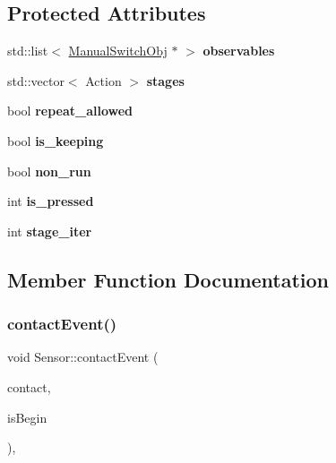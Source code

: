 \subsection*{Protected Attributes}
\begin{DoxyCompactItemize}
\item 
\mbox{\label{class_sensor_a3056529f52d9af83b78bc7ca7e2e7ef2}} 
std\+::list$<$ \hyperlink{class_manual_switch_obj}{Manual\+Switch\+Obj} $\ast$ $>$ {\bfseries observables}
\item 
\mbox{\label{class_sensor_a2450a980532d0448e7ea1f9db91f79f7}} 
std\+::vector$<$ Action $>$ {\bfseries stages}
\item 
\mbox{\label{class_sensor_a8554cb0f6e9cfcc6f277795bdd45ce14}} 
bool {\bfseries repeat\+\_\+allowed}
\item 
\mbox{\label{class_sensor_ace9f91b1e1034b501ba8f16e46b61698}} 
bool {\bfseries is\+\_\+keeping}
\item 
\mbox{\label{class_sensor_a40badc87a0a663f3bcbc95867b6f6296}} 
bool {\bfseries non\+\_\+run}
\item 
\mbox{\label{class_sensor_aff0be53ae0ed2e7f2a34e93bd78eed5d}} 
int {\bfseries is\+\_\+pressed}
\item 
\mbox{\label{class_sensor_aaf93d0f69a770e911edaf5f265eec623}} 
int {\bfseries stage\+\_\+iter}
\end{DoxyCompactItemize}


\subsection{Member Function Documentation}
\mbox{\label{class_sensor_a08bfa36c84277677f3bd5fb14127fca7}} 
\subsubsection{\texorpdfstring{contact\+Event()}{contactEvent()}}
{\footnotesize\ttfamily void Sensor\+::contact\+Event (\begin{DoxyParamCaption}\item[{b2\+Contact $\ast$}]{contact,  }\item[{bool}]{is\+Begin }\end{DoxyParamCaption})\hspace{0.3cm}{\ttfamily [protected]}, {\ttfamily [virtual]}}



